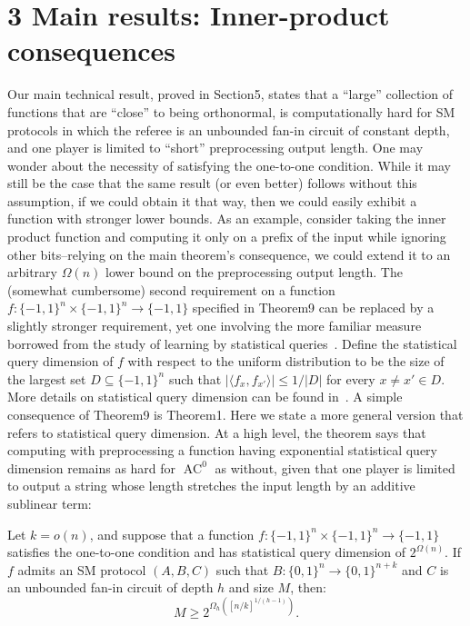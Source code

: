 \section*{3 Main results: Inner-product consequences}
Our main technical result, proved in Section5, states that a ``large'' collection of functions that are ``close'' to being orthonormal, is computationally hard for SM protocols in which the referee is an unbounded fan-in circuit of constant depth, and one player is limited to ``short'' preprocessing output length.
One may wonder about the necessity of satisfying the one-to-one condition. While it may still be the case that the same result (or even better) follows without this assumption, if we could obtain it that way, then we could easily exhibit a function with stronger lower bounds. As an example, consider taking the inner product function and computing it only on a prefix of the input while ignoring other bits--relying on the main theorem's consequence, we could extend it to an arbitrary $\Omega(n)$ lower bound on the preprocessing output length.
The (somewhat cumbersome) second requirement on a function $f:\{-1,1\}^n\times\{-1,1\}^n\to\{-1,1\}$ specified in Theorem9 can be replaced by a slightly stronger requirement, yet one involving the more familiar measure borrowed from the study of learning by statistical queries~\cite{ref23}. Define the statistical query dimension of $f$ with respect to the uniform distribution to be the size of the largest set $D\subseteq\{-1,1\}^n$ such that $|\langle f_x,f_{x'}\rangle|\leq1/|D|$ for every $x\ne x'\in D$. More details on statistical query dimension can be found in~\cite{ref7}.
A simple consequence of Theorem9 is Theorem1. Here we state a more general version that refers to statistical query dimension. At a high level, the theorem says that computing with preprocessing a function having exponential statistical query dimension remains as hard for $\operatorname{AC}^0$ as without, given that one player is limited to output a string whose length stretches the input length by an additive sublinear term:
\setcounter{nttheorem}{9}
\begin{ntproposition}
Let $k=o(n)$, and suppose that a function $f:\{-1,1\}^n\times\{-1,1\}^n\to\{-1,1\}$ satisfies the one-to-one condition and has statistical query dimension of $2^{\Omega(n)}$. If $f$ admits an SM protocol $(A,B,C)$ such that $B:\{0,1\}^n\to\{0,1\}^{n+k}$ and $C$ is an unbounded fan-in circuit of depth $h$ and size $M$, then:
\[M\geq2^{\Omega_h([n/k]^{1/(h-1)})}.\]
\end{ntproposition}
